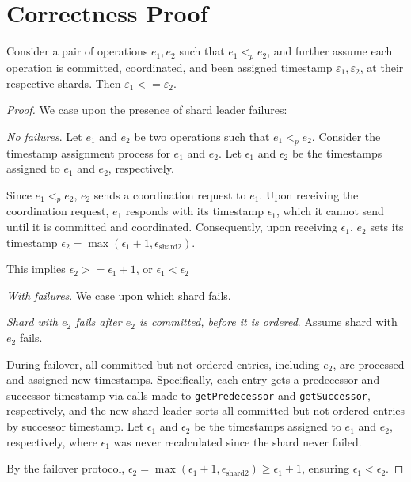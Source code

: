 \section{Correctness Proof}
\label{sec:correctness}


\begin{lem}
\label{lemma1}
Consider a pair of operations $e_1, e_2$ such that $e_1 <_p e_2$, and further assume each operation is committed, coordinated, and been assigned timestamp $\varepsilon_1, \varepsilon_2$, at their respective shards. Then $\varepsilon_1 <= \varepsilon_2$.
\end{lem}
\begin{proof}
We case upon the presence of shard leader failures:

 \textit{No failures}.
Let $e_1$ and $e_2$ be two operations such that $e_1 <_p e_2$.
Consider the timestamp assignment process for $e_1$ and $e_2$. Let $\epsilon_1$ and $\epsilon_2$ be the timestamps assigned to $e_1$ and $e_2$, respectively.

Since $e_1 <_p e_2$, $e_2$ sends a coordination request to $e_1$. Upon receiving the coordination request, $e_1$ responds with its timestamp $\epsilon_1$, which it cannot send until it is committed and coordinated. Consequently, upon receiving $\epsilon_1$, $e_2$ sets its timestamp $\epsilon_2 = \max(\epsilon_1 + 1, \epsilon_{\text{shard}2})$.

This implies $\epsilon_2 >= \epsilon_1 + 1$, or $\epsilon_1 < \epsilon_2$

 \textit{With failures}.
We case upon which shard fails.

 \textit{Shard with $e_2$ fails after $e_2$ is committed, before it is ordered}.
Assume shard with $e_2$ fails.

During failover, all committed-but-not-ordered entries, including $e_2$, are processed and assigned new timestamps. Specifically, each entry gets a predecessor and successor timestamp via calls made to \texttt{getPredecessor} and \texttt{getSuccessor}, respectively, and the new shard leader sorts all committed-but-not-ordered entries by successor timestamp. Let $\epsilon_1$ and $\epsilon_2$ be the timestamps assigned to $e_1$ and $e_2$, respectively, where $\epsilon_1$ was never recalculated since the shard never failed.

By the failover protocol, $\epsilon_2 = \max(\epsilon_1 + 1, \epsilon_{\text{shard}2}) \geq \epsilon_1 + 1$, ensuring $\epsilon_1 < \epsilon_2$.


\end{proof}
